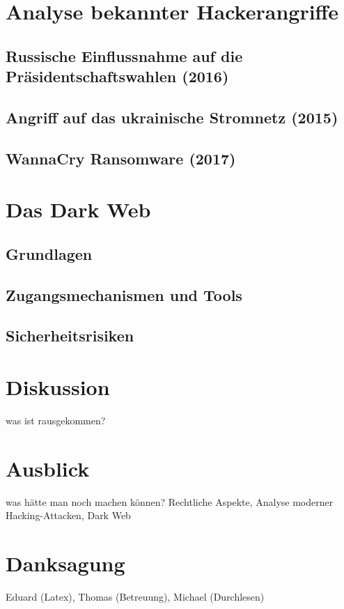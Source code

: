 \documentclass[11pt, a4paper]{article}
\begin{document}
\newpage
\section{Analyse bekannter Hackerangriffe}

\subsection{Russische Einflussnahme auf die Präsidentschaftswahlen (2016)}

\subsection{Angriff auf das ukrainische Stromnetz (2015)}

\subsection{WannaCry Ransomware (2017)}


\section{Das Dark Web}

\subsection{Grundlagen}

\subsection{Zugangsmechanismen und Tools}

\subsection{Sicherheitsrisiken}

\section{Diskussion}
was ist rausgekommen?

\section{Ausblick}
was hätte man noch machen können? Rechtliche Aspekte, Analyse moderner Hacking-Attacken, Dark Web

\section*{Danksagung}
Eduard (Latex), Thomas (Betreuung), Michael (Durchlesen)
\end{document}
